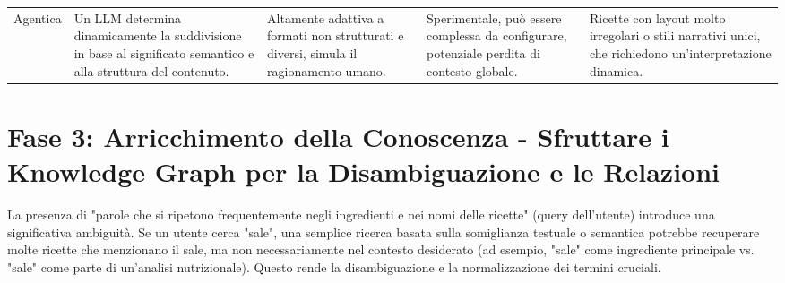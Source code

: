 \documentclass[a4paper, 11pt]{article}
\begin{document}
\begin{longtable}{>{\raggedright\arraybackslash}p{2.5cm} >{\raggedright\arraybackslash}p{3.5cm} >{\raggedright\arraybackslash}p{3.5cm} >{\raggedright\arraybackslash}p{3cm} >{\raggedright\arraybackslash}p{3.5cm}}
\addlinespace
Agentica \cite{chunking_strategies_ibm} & Un LLM determina dinamicamente la suddivisione in base al significato semantico e alla struttura del contenuto. & Altamente adattiva a formati non strutturati e diversi, simula il ragionamento umano. \cite{chunking_strategies_ibm} & Sperimentale, può essere complessa da configurare, potenziale perdita di contesto globale. \cite{f22_chunking_strategies} & Ricette con layout molto irregolari o stili narrativi unici, che richiedono un'interpretazione dinamica. \\
\end{longtable}

\section{Fase 3: Arricchimento della Conoscenza - Sfruttare i Knowledge Graph per la Disambiguazione e le Relazioni}
La presenza di "parole che si ripetono frequentemente negli ingredienti e nei nomi delle ricette" (query dell'utente) introduce una significativa ambiguità. Se un utente cerca "sale", una semplice ricerca basata sulla somiglianza testuale o semantica potrebbe recuperare molte ricette che menzionano il sale, ma non necessariamente nel contesto desiderato (ad esempio, "sale" come ingrediente principale vs. "sale" come parte di un'analisi nutrizionale). Questo rende la disambiguazione e la normalizzazione dei termini cruciali.
\end{document}
